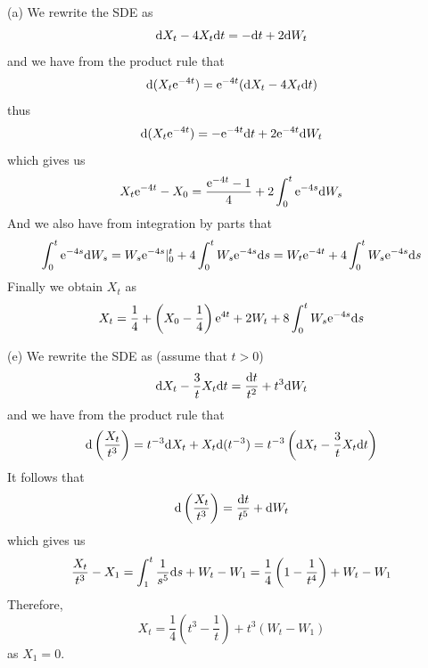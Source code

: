 \documentclass{homework}
\begin{document}
    \problem
    \begin{subproblem}
        \item[(a)]
        We rewrite the SDE as
        \[\mathrm d X_t-4X_t\mathrm d t=-\mathrm d t+2\mathrm d W_t\]
        and we have from the product rule that
        \[\mathrm d(X_t\mathrm e^{-4t})=\mathrm e^{-4t}(\mathrm d X_t-4X_t\mathrm d t)\]
        thus
        \[\mathrm d(X_t\mathrm e^{-4t})=-\mathrm e^{-4t}\mathrm d t+2\mathrm e^{-4t}\mathrm d W_t\]
        which gives us
        \[X_t\mathrm e^{-4t}-X_0=\frac{\mathrm e^{-4t}-1}{4}+2\int_0^t\mathrm e^{-4s}\mathrm d W_s\]
        And we also have from integration by parts that
        \[\int_0^t\mathrm e^{-4s}\mathrm d W_s=W_s\mathrm e^{-4s}|_0^t+4\int_0^tW_s\mathrm e^{-4s}\mathrm d s
        =W_t\mathrm e^{-4t}+4\int_0^tW_s\mathrm e^{-4s}\mathrm d s\]
        Finally we obtain $X_t$ as
        \[X_t=\frac{1}{4}+\left(X_0-\frac{1}{4}\right)\mathrm e^{4t}+2W_t+8\int_0^tW_s\mathrm e^{-4s}\mathrm d s\]

        \item[(e)]
        We rewrite the SDE as (assume that $t>0$)
        \[\mathrm d X_t-\frac{3}{t}X_t\mathrm d t=\frac{\mathrm d t}{t^2}+t^3\mathrm d W_t\]
        and we have from the product rule that
        \[\mathrm d\left(\frac{X_t}{t^3}\right)=t^{-3}\mathrm d X_t+X_t\mathrm d(t^{-3})
        =t^{-3}\left(\mathrm d X_t-\frac{3}{t}X_t\mathrm d t\right)\]
        It follows that
        \[\mathrm d\left(\frac{X_t}{t^3}\right)=\frac{\mathrm d t}{t^5}+\mathrm d W_t\]
        which gives us
        \[\frac{X_t}{t^3}-X_1=\int_1^t\frac{1}{s^5}\mathrm d s+W_t-W_1
        =\frac{1}{4}\left(1-\frac{1}{t^4}\right)+W_t-W_1\]
        Therefore,
        \[X_t=\frac{1}{4}\left(t^3-\frac{1}{t}\right)+t^3(W_t-W_1)\]
        as $X_1=0$.
    \end{subproblem}
\end{document}
